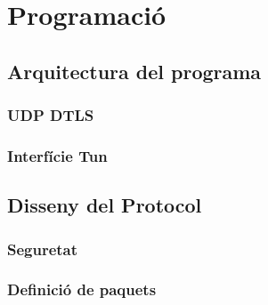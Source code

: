 \chapter{Programació}
\section{Arquitectura del programa}
\subsection{UDP DTLS}
\subsection{Interfície Tun}
\section{Disseny del Protocol}
\subsection{Seguretat}
\subsection{Definició de paquets}
